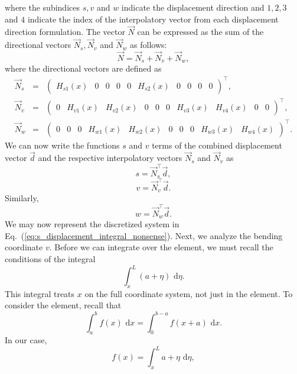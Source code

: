 where the subindices $s,v$ and $w$ indicate the displacement direction and $1,2,3$ and $4$ indicate the index of the interpolatory vector from each displacement direction formulation. The vector $\vec N$ can be expressed as the sum of the directional vectors $\vec{N}_s,\vec{N}_v$ and $\vec{N}_w$ as follows:
\begin{equation}
\vec{N} = \vec{N}_s + \vec{N}_v + \vec{N}_w,
\end{equation}
where the directional vectors are defined as
\begin{eqnarray}
\vec{N}_s &=&
\begin{pmatrix}
H_{s1}(x) & 0 & 0 & 0 & 0 & H_{s2}(x) & 0 & 0 & 0 & 0
\end{pmatrix}^\top, \\
\vec{N}_v &=&
\begin{pmatrix}
0 & H_{v1}(x) & H_{v2}(x) & 0 & 0 & 0 & H_{v3}(x) & H_{v4}(x) & 0 & 0
\end{pmatrix}^\top, \\
\vec{N}_w &=&
\begin{pmatrix}
0 & 0 & 0 & H_{w1}(x) & H_{w2}(x) & 0 & 0 & 0 & H_{w3}(x) & H_{w4}(x)
\end{pmatrix}^\top .
\end{eqnarray}
We can now write the functions $s$ and $v$ terms of the combined displacement vector $\vec d$ and the respective interpolatory vectors $\vec N_s$ and $\vec N_v$ as
\begin{equation}
s = \vec N_s^\top \vec d,
\end{equation}
\begin{equation}
v = \vec N_v^\top \vec d.
\end{equation}
Similarly,
\begin{equation}
w = \vec N_w^\top \vec d.
\end{equation}
We may now represent the discretized system in Eq.~(\ref{eq:s_displacement_integral_nonsense}). Next, we analyze the bending coordinate $v$. Before we can integrate over the element, we must recall the conditions of the integral 
\begin{equation}
\int_x^L(a+\eta)\text{ d}\eta.
\end{equation}
This integral treats $x$ on the full coordinate system, not just in the element. To consider the element, recall that
\begin{equation}
\int_a^bf(x)\text{ d}x = \int_0^{b-a}f(x+a)\text{ d}x.
\end{equation}
In our case,
\begin{equation}
f(x) = \int_x^L a+\eta\text{ d}\eta,
\end{equation}
